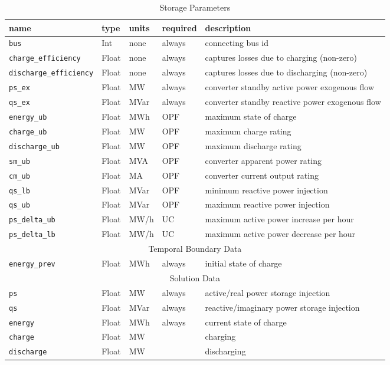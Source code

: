 \documentclass{article}
\begin{document}
\begin{table}[h]
\centering
\caption{Storage Parameters}
\begin{tabular}{|l|l|l|l|p{5cm}|}
\hline
name & type & units & required & description \\ 
\hline
\hline
\texttt{bus} & Int & none & always & connecting bus id \\ 
\hline
\texttt{charge\_efficiency} & Float & none & always & captures losses due to charging (non-zero) \\ 
\hline
\texttt{discharge\_efficiency} & Float & none & always &  captures losses due to discharging (non-zero) \\ 
\hline
\texttt{ps\_ex} & Float & MW & always & converter standby active power exogenous flow \\ 
\hline
\texttt{qs\_ex} & Float & MVar & always & converter standby reactive power exogenous flow \\ 
\hline
\texttt{energy\_ub} & Float & MWh & OPF & maximum state of charge \\ 
\hline
\texttt{charge\_ub} & Float & MW & OPF & maximum charge rating \\ 
\hline
\texttt{discharge\_ub} & Float & MW & OPF & maximum discharge rating \\ 
\hline
\texttt{sm\_ub} & Float & MVA & OPF & converter apparent power rating \\ 
\hline
\texttt{cm\_ub} & Float & MA & OPF & converter current output rating \\ 
\hline
\texttt{qs\_lb} & Float & MVar & OPF & minimum reactive power injection \\ 
\hline
\texttt{qs\_ub} & Float & MVar & OPF & maximum reactive power injection \\ 
\hline
\texttt{ps\_delta\_ub} & Float & MW/h & UC & maximum active power increase per hour \\ 
\hline
\texttt{ps\_delta\_lb} & Float & MW/h & UC & maximum active power decrease per hour \\ 
\hline
%
\hline
\multicolumn{5}{|c|}{Temporal Boundary Data} \\
\hline
\texttt{energy\_prev} & Float & MWh & always & initial state of charge \\ 
\hline
%
\hline
\multicolumn{5}{|c|}{Solution Data} \\
\hline
\texttt{ps} & Float & MW & always & active/real power storage injection \\ 
\hline
\texttt{qs} & Float & MVar & always & reactive/imaginary power storage injection \\ 
\hline
\texttt{energy} & Float & MWh & always & current state of charge \\ 
\hline
\texttt{charge} & Float & MW & & charging \\ 
\hline
\texttt{discharge} & Float & MW & & discharging \\ 
\hline
\end{tabular}
\label{tbl:strage}
\end{table}
\end{document}
